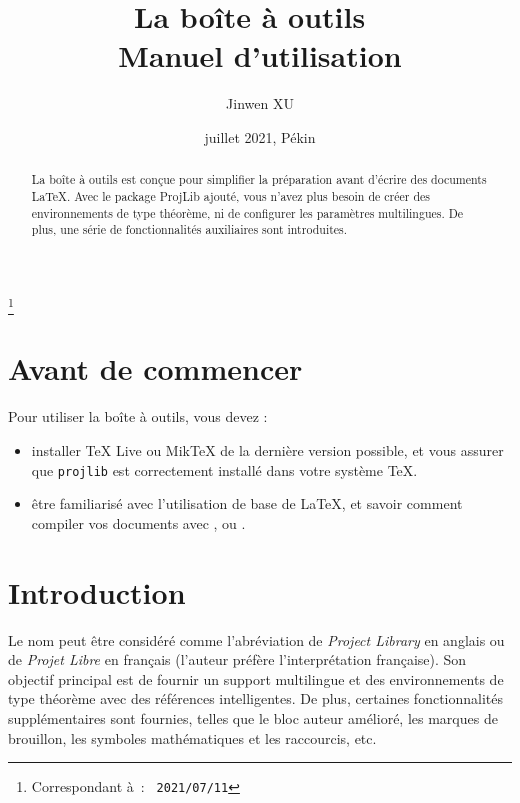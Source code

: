\documentclass[English,Chinese,French,allowbf,puretext]{lebhart}
\providecommand{\ProjLibPackage}{\mbox{\textsf{ProjLib}}}
\begin{document}
\title{La boîte à outils~\,\ProjLib{}\\[.3\baselineskip]\normalsize Manuel d'utilisation}
\author{Jinwen XU}
\thanks{Correspondant à : \texttt{\ProjLib{}~2021/07/11}}
\date{juillet 2021, Pékin}

\maketitle

\begin{abstract}
    La boîte à outils \ProjLib{} est conçue pour simplifier la préparation avant d'écrire des documents \LaTeX{}. Avec le package \ProjLibPackage{} ajouté, vous n'avez plus besoin de créer des environnements de type théorème, ni de configurer les paramètres multilingues. De plus, une série de fonctionnalités auxiliaires sont introduites.
\end{abstract}

\begin{multicols}{2}
    \small
    \tableofcontents
\end{multicols}

\medskip

\section*{Avant de commencer}

Pour utiliser la boîte à outils, vous devez :
\begin{itemize}
      \item installer TeX Live ou MikTeX de la dernière version possible, et vous assurer que \texttt{projlib} est correctement installé dans votre système \TeX{}.
      \item être familiarisé avec l'utilisation de base de \LaTeX{}, et savoir comment compiler vos documents avec ,  ou .
\end{itemize}

\section{Introduction}

Le nom \ProjLib{} peut être considéré comme l'abréviation de \emph{Project Library} en anglais ou de \emph{Projet Libre} en français (l'auteur préfère l'interprétation française). Son objectif principal est de fournir un support multilingue et des environnements de type théorème avec des références intelligentes. De plus, certaines fonctionnalités supplémentaires sont fournies, telles que le bloc auteur amélioré, les marques de brouillon, les symboles mathématiques et les raccourcis, etc.
\end{document}
